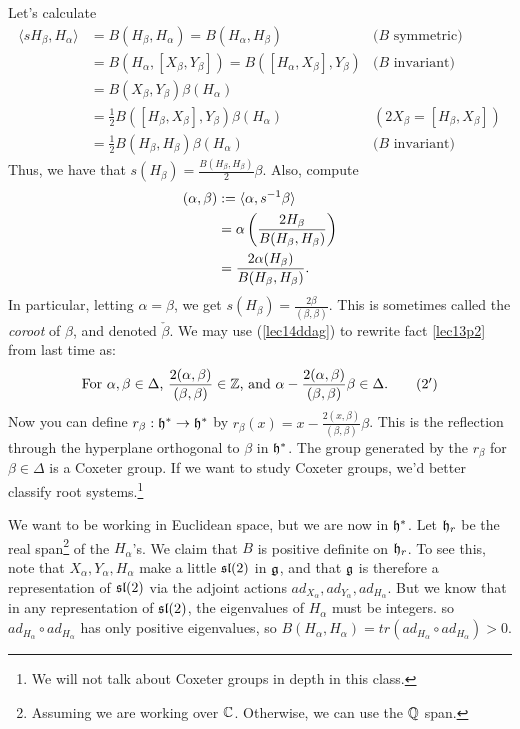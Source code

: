  Let's calculate
 \begin{align*}
   \langle sH_\beta, H_\alpha\rangle &= B(H_\beta,H_\alpha) = B(H_\alpha,H_\beta) & \text{($B$ symmetric)}\\
    &= B(H_\alpha, [X_\beta, Y_\beta]) = B([H_\alpha, X_\beta], Y_\beta) &\text{($B$ invariant)} \\
    &=  B(X_\beta,Y_\beta) \beta(H_\alpha) \\
    &= \frac{1}{2} B([H_\beta,X_\beta],Y_\beta) \beta(H_\alpha) & (2X_\beta = [H_\beta,X_\beta])\\
    &=  \frac{1}{2} B(H_\beta, H_\beta)\beta(H_\alpha) & \text{($B$ invariant)}
 \end{align*}
 Thus, we have that $s(H_\beta) = \frac{B(H_\beta,H_\beta)}{2} \beta$. Also, compute
 \begin{align}
   (\alpha, \beta) &:= \langle \alpha, s^{-1}\beta\rangle\notag\\
   &= \alpha\left( \frac{2H_\beta}{B(H_\beta,H_\beta)}\right)\notag\\
   &= \frac{2\alpha(H_\beta)}{B(H_\beta,H_\beta)}. \label{lec14ddag}
 \end{align}
 In particular, letting $\alpha=\beta$, we get $s(H_\beta) =
 \frac{2\beta}{(\beta,\beta)}$. This is sometimes called the
 \emph{coroot} of $\beta$, and denoted $\check\beta$. We may use
 (\ref{lec14ddag}) to rewrite fact \ref{lec13p2} from last time as:
 \[
 \text{For $\alpha,\beta\in \Delta$, $\frac{2(\alpha,\beta)}{(\beta,\beta)}\in \ZZ$, and
 $\alpha - \frac{2(\alpha,\beta)}{(\beta,\beta)}\beta\in \Delta$.}\tag{$2'$}
 \]
 Now you can define $r_\beta:\h^*\to \h^*$ by $r_\beta(x) =
 x-\frac{2(x,\beta)}{(\beta,\beta)}\beta$. This is the reflection through the
 hyperplane orthogonal to $\beta$ in $\h^*$. The group generated by the $r_\beta$ for
 $\beta\in \Delta$ is a Coxeter group. If we want to study
 Coxeter groups, we'd better classify root systems.\footnote{We will not talk about
 Coxeter groups in depth in this class.}

 We want to be working in Euclidean space, but we are now in $\h^*$. Let $\h_r$ be the
 real span\footnote{Assuming we are working over $\CC$. Otherwise, we can use the
 $\QQ$ span.} of the $H_\alpha$'s. We claim that $B$ is positive definite on $\h_r$.
 To see this, note that $X_\alpha, Y_\alpha, H_\alpha$ make a little $\sl(2)$ in $\g$,
 and that $\g$ is therefore a representation of $\sl(2)$ via the adjoint actions
 $ad_{X_\alpha},ad_{Y_\alpha},ad_{H_\alpha}$. But we know that in any representation
 of $\sl(2)$, the eigenvalues of $H_\alpha$ must be integers. so
 $ad_{H_\alpha}\circ ad_{H_\alpha}$ has only positive eigenvalues, so
 $B(H_\alpha,H_\alpha)=tr(ad_{H_\alpha}\circ ad_{H_\alpha})>0$.

